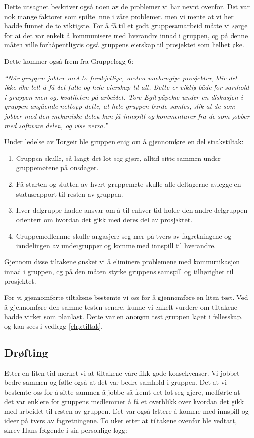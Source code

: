 Dette utsagnet beskriver også noen av de problemer vi har nevnt ovenfor. Det var nok mange faktorer som spilte inne i våre problemer, men vi mente at vi her hadde funnet de to viktigste. For å få til et godt gruppesamarbeid måtte vi sørge for at det var enkelt å kommunisere med hverandre innad i gruppen, og på denne måten ville forhåpentligvis også gruppens eierskap til prosjektet som helhet øke.

Dette kommer også frem fra Gruppelogg 6:\newline

\emph{``Når gruppen jobber med to forskjellige, nesten uavhengige prosjekter, blir det ikke like lett å få det fulle og hele eierskap til alt. Dette er viktig både for samhold i gruppen men og, kvaliteten på arbeidet. Tore Egil påpekte under en diskusjon i gruppen angående nettopp dette, at hele gruppen burde samles, slik at de som jobber med den mekaniske delen kan få innspill og kommentarer fra de som jobber med software delen, og vise versa.''}\newline

Under ledelse av Torgeir ble gruppen enig om å gjennomføre en del strakstiltak:

\begin{enumerate}
\item Gruppen skulle, så langt det lot seg gjøre, alltid sitte sammen under gruppemøtene på onsdager. 
\item På starten og slutten av hvert gruppemøte skulle alle deltagerne avlegge en statusrapport til resten av gruppen. 
\item Hver delgruppe hadde ansvar om å til enhver tid holde den andre delgruppen orientert om hvordan det gikk med deres del av prosjektet.
\item Gruppemedlemme skulle angasjere seg mer på tvers av fagretningene og inndelingen av undergrupper og komme med innspill til hverandre. 
\end{enumerate}

Gjennom disse tiltakene ønsket vi å eliminere problemene med kommunikasjon innad i gruppen, og på den måten styrke gruppens samspill og tilhørighet til prosjektet.\newline

Før vi gjennomførte tiltakene bestemte vi oss for å gjennomføre en liten test. Ved å gjennomføre den samme testen senere, kunne vi enkelt vurdere om tiltakene hadde virket som planlagt. Dette var en anonym test gruppen laget i fellesskap, og kan sees i vedlegg \ref{chp:tiltak}.
\subsection{Drøfting}
Etter en liten tid merket vi at tiltakene våre fikk gode konsekvenser. Vi jobbet bedre sammen og følte også at det var bedre samhold i gruppen. 
Det at vi bestemte oss for å sitte sammen å jobbe så fremt det lot seg gjøre, medførte at det var enklere for gruppens medlemmer å få et overblikk over hvordan det gikk med arbeidet til resten av gruppen. Det var også lettere å komme med innspill og ideer på tvers av fagretningene. 
To uker etter at tiltakene ovenfor ble vedtatt, skrev Hans følgende i sin personlige logg:\newline

